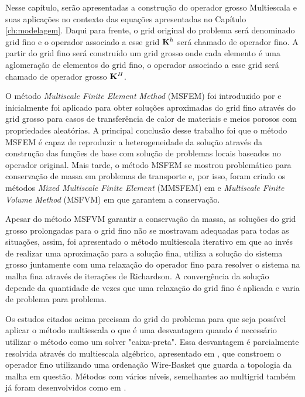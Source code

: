 
Nesse capítulo, serão apresentadas a construção do operador grosso Multiescala e suas aplicações no contexto das equações apresentadas no Capítulo \ref{ch:modelagem}. Daqui para frente, o grid original do problema será denominado grid fino e o operador associado a esse grid $\mathbf{K}^h$ será chamado de operador fino. A partir do grid fino será construído um grid grosso onde cada elemento é uma aglomeração de elementos do grid fino, o operador associado a esse grid será chamado de operador grosso $\mathbf{K}^H$.


O método \textit{Multiscale Finite Element Method} (MSFEM) foi introduzido por \citet{thomashou} e inicialmente foi aplicado para obter soluções aproximadas do grid fino através do grid grosso para casos de transferência de calor de materiais e meios porosos com propriedades aleatórias. A principal conclusão desse trabalho foi que o método MSFEM é capaz de reproduzir a heterogeneidade da solução através da construção das funções de base com solução de problemas locais baseados no operador original. Mais tarde, o método MSFEM se mostrou problemático para conservação de massa em problemas de transporte e, por isso, foram criado os métodos \textit{Mixed Multiscale Finite Element} (MMSFEM) em \citet{mixedmsfem} e  \textit{Multiscale Finite Volume Method} (MSFVM) em \citet{msfv} que garantem a conservação.


Apesar do método MSFVM garantir a conservação da massa, as soluções do grid grosso prolongadas para o grid fino não se mostravam adequadas para todas as situações, assim, foi apresentado o método multiescala iterativo em \citet{iterativems} que ao invés de realizar uma aproximação para a solução fina, utiliza a solução do sistema grosso juntamente com uma relaxação do operador fino para resolver o sistema na malha fina através de iterações de Richardson. A convergência da solução depende da quantidade de vezes que uma relaxação do grid fino é aplicada e varia de problema para problema.


Os estudos citados acima precisam do grid do problema para que seja possível aplicar o método multiescala o que é uma desvantagem quando é necessário utilizar o método como um solver "caixa-preta". Essa desvantagem é parcialmente resolvida através do multiescala algébrico, apresentado em \citet{msalgebrico}, que constroem o operador fino utilizando uma ordenação Wire-Basket que guarda a topologia da malha em questão. Métodos com vários níveis, semelhantes ao multigrid também já foram desenvolvidos como em \citet{multilevel}.


